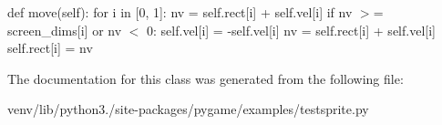 def move(self)\+: for i in \mbox{[}0, 1\mbox{]}\+: nv = self.\+rect\mbox{[}i\mbox{]} + self.\+vel\mbox{[}i\mbox{]} if nv $>$= screen\+\_\+dims\mbox{[}i\mbox{]} or nv $<$ 0\+: self.\+vel\mbox{[}i\mbox{]} = -\/self.\+vel\mbox{[}i\mbox{]} nv = self.\+rect\mbox{[}i\mbox{]} + self.\+vel\mbox{[}i\mbox{]} self.\+rect\mbox{[}i\mbox{]} = nv 

The documentation for this class was generated from the following file\+:\begin{DoxyCompactItemize}
\item 
venv/lib/python3./site-\/packages/pygame/examples/testsprite.\+py\end{DoxyCompactItemize}

